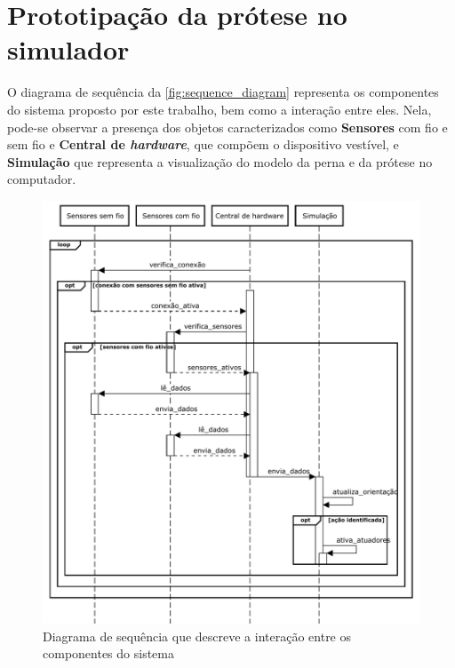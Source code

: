 \section{Prototipação da prótese no simulador}\label{sec:metodo_prototipacao}

O diagrama de sequência da \autoref{fig:sequence_diagram} representa os componentes do sistema proposto por este trabalho, bem como a interação entre eles. Nela, pode-se observar a presença dos objetos caracterizados como \textbf{Sensores} com fio e sem fio e \textbf{Central de \textit{hardware}}, que compõem o dispositivo vestível, e \textbf{Simulação} que representa a visualização do modelo da perna e da prótese no computador.

\begin{figure}[ht]
	\caption{\label{fig:sequence_diagram}Diagrama de sequência que descreve a interação entre os componentes do sistema}
	\begin{center}
	    \includegraphics[width=\textwidth]{resources/sequence_diagram}
	\end{center}
\end{figure}

